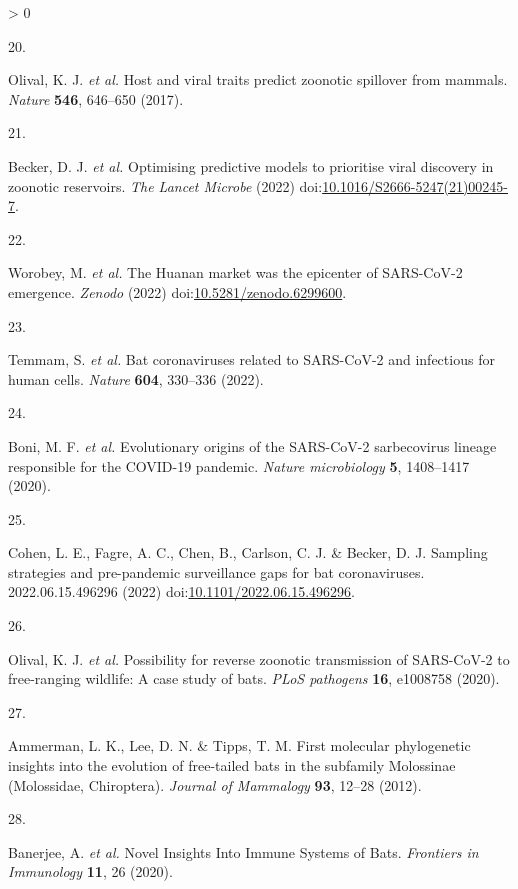 \documentclass[10pt,oneside]{article}
\newlength{\cslhangindent}
\newlength{\csllabelwidth}
\newenvironment{CSLReferences}[3] %
 {%
  \setlength{\parindent}{0pt}
  \ifodd #1 \everypar{\setlength{\hangindent}{\cslhangindent}}\ignorespaces\fi
  \ifnum #2 > 0
  \setlength{\parskip}{#2\baselineskip}
  \fi
 }%
 {}
\newcommand{\CSLLeftMargin}[1]{\parbox[t]{\maxof{\widthof{#1}}{\csllabelwidth}}{#1}}
\newcommand{\CSLRightInline}[1]{\parbox[t]{\linewidth}{#1}}
\begin{document}
\begin{CSLReferences}{0}{0}
\leavevmode\hypertarget{ref-Olival2017Host}{}%
\CSLLeftMargin{20. }
\CSLRightInline{Olival, K. J. \emph{et al.} Host and viral traits
predict zoonotic spillover from mammals. \emph{Nature} \textbf{546},
646--650 (2017).}

\leavevmode\hypertarget{ref-Becker2022Optimising}{}%
\CSLLeftMargin{21. }
\CSLRightInline{Becker, D. J. \emph{et al.} Optimising predictive models
to prioritise viral discovery in zoonotic reservoirs. \emph{The Lancet
Microbe} (2022)
doi:\href{https://doi.org/10.1016/S2666-5247(21)00245-7}{10.1016/S2666-5247(21)00245-7}.}

\leavevmode\hypertarget{ref-Worobey2022Huanan}{}%
\CSLLeftMargin{22. }
\CSLRightInline{Worobey, M. \emph{et al.} The Huanan market was the
epicenter of SARS-CoV-2 emergence. \emph{Zenodo} (2022)
doi:\href{https://doi.org/10.5281/zenodo.6299600}{10.5281/zenodo.6299600}.}

\leavevmode\hypertarget{ref-Temmam2022Bat}{}%
\CSLLeftMargin{23. }
\CSLRightInline{Temmam, S. \emph{et al.} Bat coronaviruses related to
SARS-CoV-2 and infectious for human cells. \emph{Nature} \textbf{604},
330--336 (2022).}

\leavevmode\hypertarget{ref-Boni2020Evolutionary}{}%
\CSLLeftMargin{24. }
\CSLRightInline{Boni, M. F. \emph{et al.} Evolutionary origins of the
SARS-CoV-2 sarbecovirus lineage responsible for the COVID-19 pandemic.
\emph{Nature microbiology} \textbf{5}, 1408--1417 (2020).}

\leavevmode\hypertarget{ref-Cohen2022Sampling}{}%
\CSLLeftMargin{25. }
\CSLRightInline{Cohen, L. E., Fagre, A. C., Chen, B., Carlson, C. J. \&
Becker, D. J. Sampling strategies and pre-pandemic surveillance gaps for
bat coronaviruses. 2022.06.15.496296 (2022)
doi:\href{https://doi.org/10.1101/2022.06.15.496296}{10.1101/2022.06.15.496296}.}

\leavevmode\hypertarget{ref-Olival2020Possibility}{}%
\CSLLeftMargin{26. }
\CSLRightInline{Olival, K. J. \emph{et al.} Possibility for reverse
zoonotic transmission of SARS-CoV-2 to free-ranging wildlife: A case
study of bats. \emph{PLoS pathogens} \textbf{16}, e1008758 (2020).}

\leavevmode\hypertarget{ref-Ammerman2012First}{}%
\CSLLeftMargin{27. }
\CSLRightInline{Ammerman, L. K., Lee, D. N. \& Tipps, T. M. First
molecular phylogenetic insights into the evolution of free-tailed bats
in the subfamily Molossinae (Molossidae, Chiroptera). \emph{Journal of
Mammalogy} \textbf{93}, 12--28 (2012).}

\leavevmode\hypertarget{ref-Banerjee2020Novel}{}%
\CSLLeftMargin{28. }
\CSLRightInline{Banerjee, A. \emph{et al.} Novel Insights Into Immune
Systems of Bats. \emph{Frontiers in Immunology} \textbf{11}, 26 (2020).}


\end{CSLReferences}
\end{document}

